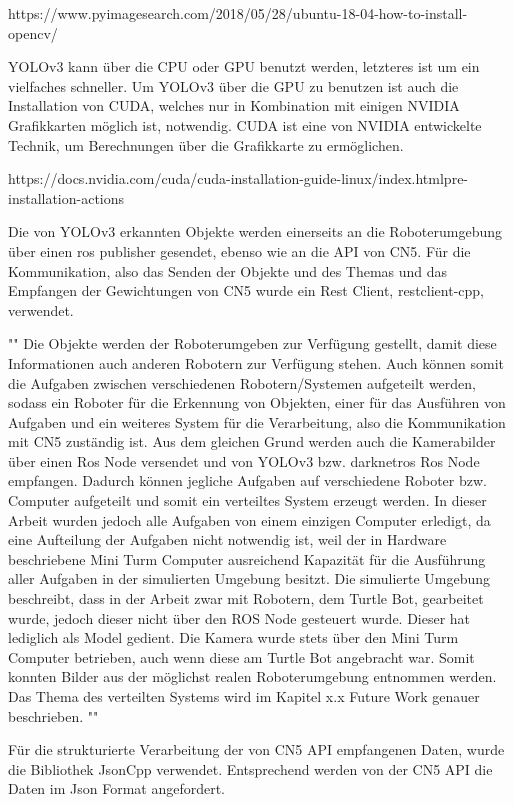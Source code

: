 https://www.pyimagesearch.com/2018/05/28/ubuntu-18-04-how-to-install-opencv/

YOLOv3 kann über die CPU oder GPU benutzt werden, letzteres ist um ein vielfaches schneller. Um YOLOv3 über die GPU zu benutzen ist auch die Installation von CUDA, welches nur in Kombination mit einigen NVIDIA Grafikkarten möglich ist, notwendig. CUDA ist eine von NVIDIA entwickelte Technik, um Berechnungen über die Grafikkarte zu ermöglichen. 

https://docs.nvidia.com/cuda/cuda-installation-guide-linux/index.htmlpre-installation-actions

Die von YOLOv3 erkannten Objekte werden einerseits an die Roboterumgebung über einen ros publisher gesendet, ebenso wie an die API von CN5. Für die Kommunikation, also das Senden der Objekte und des Themas und das Empfangen der Gewichtungen von CN5 wurde ein Rest Client, restclient-cpp, verwendet. 


""
Die Objekte werden der Roboterumgeben zur Verfügung gestellt, damit diese Informationen auch anderen Robotern zur Verfügung stehen. Auch können somit die Aufgaben zwischen verschiedenen Robotern/Systemen aufgeteilt werden, sodass ein Roboter für die Erkennung von Objekten, einer für das Ausführen von Aufgaben und ein weiteres System für die Verarbeitung, also die Kommunikation mit CN5 zuständig ist. Aus dem gleichen Grund werden auch die Kamerabilder über einen Ros Node versendet und von YOLOv3 bzw. darknetros Ros Node empfangen. Dadurch können jegliche Aufgaben auf verschiedene Roboter bzw. Computer aufgeteilt und somit ein verteiltes System erzeugt werden. In dieser Arbeit wurden jedoch alle Aufgaben von einem einzigen Computer erledigt, da eine Aufteilung der Aufgaben nicht notwendig ist, weil der in Hardware beschriebene Mini Turm Computer ausreichend Kapazität für die Ausführung aller Aufgaben in der simulierten Umgebung besitzt. Die simulierte Umgebung beschreibt, dass in der Arbeit zwar mit Robotern, dem Turtle Bot, gearbeitet wurde, jedoch dieser nicht über den ROS Node gesteuert wurde. Dieser hat lediglich als Model gedient. Die Kamera wurde stets über den Mini Turm Computer betrieben, auch wenn diese am Turtle Bot angebracht war. Somit konnten Bilder aus der möglichst realen Roboterumgebung entnommen werden. Das Thema des verteilten Systems wird im Kapitel x.x Future Work genauer beschrieben. 
""

Für die strukturierte Verarbeitung der von CN5 API empfangenen Daten, wurde die Bibliothek JsonCpp verwendet. Entsprechend werden von der CN5 API die Daten im Json Format angefordert. 

